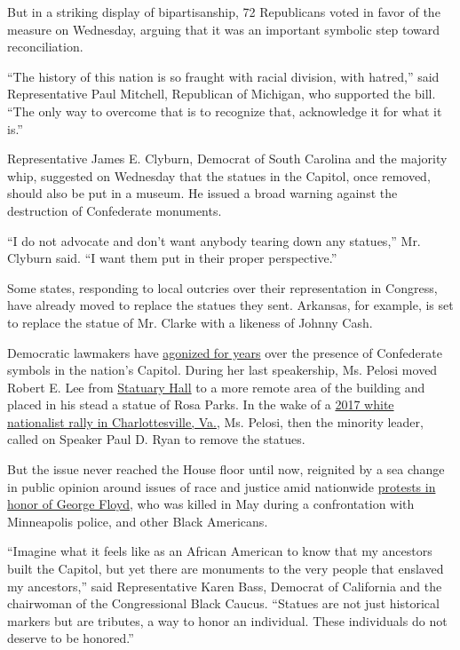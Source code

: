But in a striking display of bipartisanship, 72 Republicans voted in
favor of the measure on Wednesday, arguing that it was an important
symbolic step toward reconciliation.

``The history of this nation is so fraught with racial division, with
hatred,'' said Representative Paul Mitchell, Republican of Michigan, who
supported the bill. ``The only way to overcome that is to recognize
that, acknowledge it for what it is.''

Representative James E. Clyburn, Democrat of South Carolina and the
majority whip, suggested on Wednesday that the statues in the Capitol,
once removed, should also be put in a museum. He issued a broad warning
against the destruction of Confederate monuments.

``I do not advocate and don't want anybody tearing down any statues,''
Mr. Clyburn said. ``I want them put in their proper perspective.''

Some states, responding to local outcries over their representation in
Congress, have already moved to replace the statues they sent. Arkansas,
for example, is set to replace the statue of Mr. Clarke with a likeness
of Johnny Cash.

Democratic lawmakers have
\href{https://www.nytimes.com/2015/06/26/us/politics/search-for-confederate-symbols-finds-them-aplenty-in-washington.html}{agonized
for years} over the presence of Confederate symbols in the nation's
Capitol. During her last speakership, Ms. Pelosi moved Robert E. Lee
from
\href{http://www.aoc.gov/capitol-buildings/national-statuary-hall}{Statuary
Hall} to a more remote area of the building and placed in his stead a
statue of Rosa Parks. In the wake of a
\href{https://www.nytimes.com/2017/07/08/us/kkk-rally-charlottesville-robert-e-lee-statue.html}{2017
white nationalist rally in Charlottesville, Va.}, Ms. Pelosi, then the
minority leader, called on Speaker Paul D. Ryan to remove the statues.

But the issue never reached the House floor until now, reignited by a
sea change in public opinion around issues of race and justice amid
nationwide
\href{https://www.nytimes.com/news-event/george-floyd-protests-minneapolis-new-york-los-angeles}{protests
in honor of George Floyd}, who was killed in May during a confrontation
with Minneapolis police, and other Black Americans.

``Imagine what it feels like as an African American to know that my
ancestors built the Capitol, but yet there are monuments to the very
people that enslaved my ancestors,'' said Representative Karen Bass,
Democrat of California and the chairwoman of the Congressional Black
Caucus. ``Statues are not just historical markers but are tributes, a
way to honor an individual. These individuals do not deserve to be
honored.''

